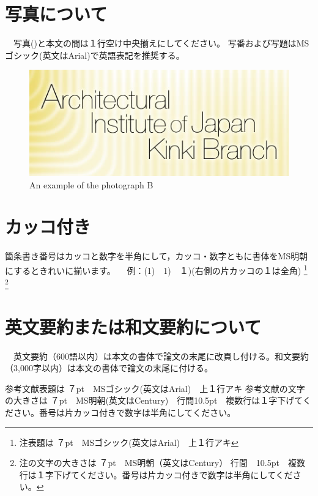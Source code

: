 \documentclass[base=8.8pt,magstyle=real,a4paper,twocolumn,xelatex,pandoc,jafont=ms]{bxjsarticle}
\begin{document}
\section{写真について}
　写真()と本文の間は１行空け中央揃えにしてください。
写番および写題はMSゴシック(英文はArial)で英語表記を推奨する。

\begin{figure}[h]
	\centering
	\includegraphics[width=1\linewidth]{../figure/photo1}
	\caption{An example of the photograph B}
	\label{fig:photo1}
\end{figure}


\section{カッコ付き}
箇条書き番号はカッコと数字を半角にして，カッコ・数字ともに書体をMS明朝にするときれいに揃います。
　例：(1)　1)　１)(右側の片カッコの１は全角)
\footnote{注表題は ７pt　MSゴシック(英文はArial)　上１行アキ}
\footnote{注の文字の大きさは ７pt　MS明朝（英文はCentury） 行間　10.5pt　複数行は１字下げてください。番号は片カッコ付きで数字は半角にしてください。}

\section{英文要約または和文要約について}
　英文要約（600語以内）は本文の書体で論文の末尾に改頁し付ける。和文要約（3,000字以内）は本文の書体で論文の末尾に付ける。


\vspace{1\Cvs}
\begin{thebibliography}{9}
		参考文献表題は ７pt　MSゴシック(英文はArial)　上１行アキ
		参考文献の文字の大きさは ７pt　MS明朝(英文はCentury)　行間10.5pt　複数行は１字下げてください。番号は片カッコ付きで数字は半角にしてください。


\end{thebibliography}
\vspace{1\Cvs}
\theendnotes
\end{document}
